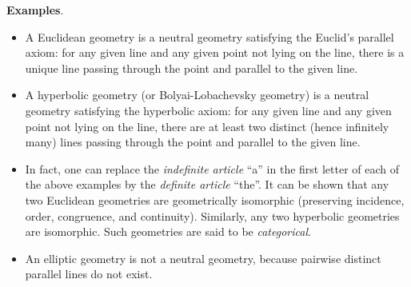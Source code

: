 \documentclass[12pt]{article}
\begin{document}
\textbf{Examples}.
\begin{itemize}
\item A Euclidean geometry is a neutral geometry satisfying the Euclid's
parallel axiom: for any given line and any given point not lying on
the line, there is a unique line passing through the point and
parallel to the given line.
\item A hyperbolic geometry (or Bolyai-Lobachevsky geometry) is a neutral
geometry satisfying the hyperbolic axiom: for any given line and any
given point not lying on the line, there are at least two distinct (hence infinitely many) 
lines passing through the point and parallel to the given line.
\item In fact, one can replace the \emph{indefinite article} ``a'' in the
first letter of each of the above examples by the \emph{definite
article} ``the''.  It can be shown that any two Euclidean geometries
are geometrically isomorphic (preserving incidence, order,
congruence, and continuity).  Similarly, any two hyperbolic
geometries are isomorphic.  Such geometries are said to be
\emph{categorical}.
\item An elliptic geometry is not a neutral geometry, because pairwise distinct parallel lines do not exist.
\end{itemize}
\end{document}
